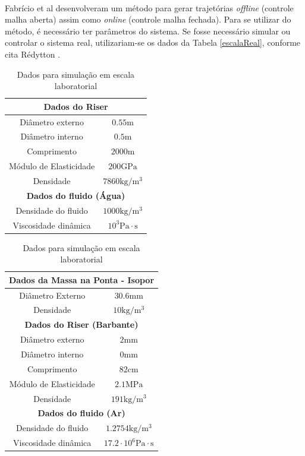 \paragraph{}Fabrício et al \cite{fabricioIFAC} desenvolveram um método para gerar trajetórias \textit{offline} (controle malha aberta) assim como \textit{online} (controle malha fechada). Para se utilizar do método, é necessário ter parâmetros do sistema. Se fosse necessário simular ou controlar o sistema real, utilizariam-se os dados da Tabela \ref{escalaReal}, conforme cita Rédytton \cite{redytton}.

\begin{table}[!ht]
\parbox{.45\linewidth}{
\centering
\caption{Dados para simulação em escala real\label{escalaReal} \cite{redytton}}
	\begin{tabular}{|c|c|}
	\hline
		\multicolumn{2}{|c|}{\textbf{Dados do Riser}}\\ \hline
		Diâmetro externo & $0.55\mathrm{m}$\\ \hline
		Diâmetro interno & $0.5\mathrm{m}$ \\ \hline
		Comprimento & $2000\mathrm{m}$ \\ \hline
		Módulo de Elasticidade & $200 \mathrm{GPa}$\\ \hline
		Densidade &  $7860\mathrm{kg}/\mathrm{m}^3$\\ \hline
		\multicolumn{2}{|c|}{\textbf{Dados do fluido (Água)}}\\ \hline
		Densidade do fluido &  $1000\mathrm{kg}/\mathrm{m}^3$\\ \hline
		Viscosidade dinâmica & $10^3 \mathrm{Pa}\cdot \mathrm{s}$ \\ \hline
	\end{tabular}
}
\hfill
\parbox{.45\linewidth}{
	\caption{Dados para simulação em escala laboratorial\label{escalaLaboratorial}}
	\centering
	\begin{tabular}{|c|c|}
		\hline
			\multicolumn{2}{|c|}{\textbf{Dados da Massa na Ponta - Isopor}} \\ \hline
			Diâmetro Externo & $30.6\mathrm{mm}$\\ \hline
			Densidade & $10\mathrm{kg}/\mathrm{m}^3$ \\ \hline
			\multicolumn{2}{|c|}{\textbf{Dados do Riser (Barbante)}}\\ \hline
			Diâmetro externo & $2\mathrm{mm}$\\ \hline
			Diâmetro interno & $0\mathrm{mm}$ \\ \hline
			Comprimento & $82\mathrm{cm}$ \\ \hline
			Módulo de Elasticidade & $2.1 \mathrm{MPa}$\\ \hline
			Densidade &  $191\mathrm{kg}/\mathrm{m}^3$\\ \hline
			\multicolumn{2}{|c|}{\textbf{Dados do fluido (Ar)}}\\ \hline
			Densidade do fluido &  $1.2754\mathrm{kg}/\mathrm{m}^3$\\ \hline
			Viscosidade dinâmica & $17.2\cdot 10^6 \mathrm{Pa}\cdot \mathrm{s}$ \\ \hline
		\end{tabular}
}

\end{table}

